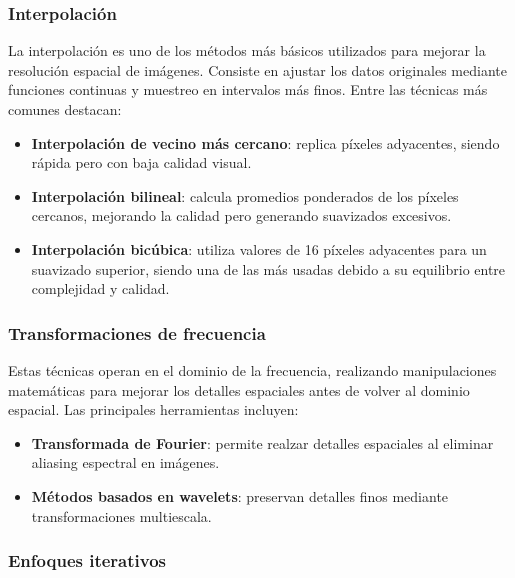         \subsubsection{Interpolación}
        
            La interpolación es uno de los métodos más básicos utilizados para mejorar la resolución espacial de imágenes. Consiste en ajustar los datos originales mediante funciones continuas y muestreo en intervalos más finos. Entre las técnicas más comunes destacan:
            
            \begin{itemize}
                \item \textbf{Interpolación de vecino más cercano}: replica píxeles adyacentes, siendo rápida pero con baja calidad visual.
                \item \textbf{Interpolación bilineal}: calcula promedios ponderados de los píxeles cercanos, mejorando la calidad pero generando suavizados excesivos.
                \item \textbf{Interpolación bicúbica}: utiliza valores de 16 píxeles adyacentes para un suavizado superior, siendo una de las más usadas debido a su equilibrio entre complejidad y calidad.
            \end{itemize}
        
        \subsubsection{Transformaciones de frecuencia}
        
            Estas técnicas operan en el dominio de la frecuencia, realizando manipulaciones matemáticas para mejorar los detalles espaciales antes de volver al dominio espacial. Las principales herramientas incluyen:
            \begin{itemize}
                \item \textbf{Transformada de Fourier}: permite realzar detalles espaciales al eliminar aliasing espectral en imágenes.
                \item \textbf{Métodos basados en wavelets}: preservan detalles finos mediante transformaciones multiescala.
            \end{itemize}
            
        \subsubsection{Enfoques iterativos}
        
